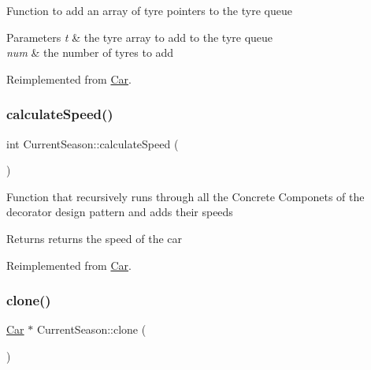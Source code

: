 Function to add an array of tyre pointers to the tyre queue 
\begin{DoxyParams}{Parameters}
{\em t} & the tyre array to add to the tyre queue \\
\hline
{\em num} & the number of tyres to add \\
\hline
\end{DoxyParams}


Reimplemented from \hyperlink{classCar_a5c5f22cb9232b88a53a4ffc324824aa1}{Car}.

\mbox{\label{classCurrentSeason_af605da3db8d851b07265951e5945669c}} 
\subsubsection{\texorpdfstring{calculate\+Speed()}{calculateSpeed()}}
{\footnotesize\ttfamily int Current\+Season\+::calculate\+Speed (\begin{DoxyParamCaption}{ }\end{DoxyParamCaption})\hspace{0.3cm}{\ttfamily [virtual]}}

Function that recursively runs through all the Concrete Componets of the decorator design pattern and adds their speeds \begin{DoxyReturn}{Returns}
returns the speed of the car 
\end{DoxyReturn}


Reimplemented from \hyperlink{classCar_aadb72568edbdf571547ec48e9781237f}{Car}.

\mbox{\label{classCurrentSeason_afaed34051750fdd603784e6ea7809075}} 
\subsubsection{\texorpdfstring{clone()}{clone()}}
{\footnotesize\ttfamily \hyperlink{classCar}{Car} $\ast$ Current\+Season\+::clone (\begin{DoxyParamCaption}{ }\end{DoxyParamCaption})\hspace{0.3cm}{\ttfamily [virtual]}}

